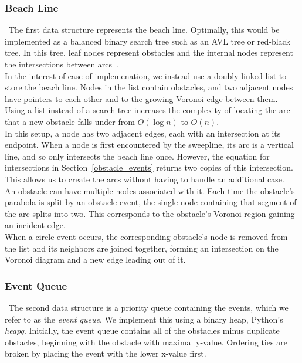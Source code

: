 \documentclass[conference]{IEEEtran}
\begin{document}
\subsubsection{Beach Line}
\noindent\ The first data structure represents the beach line. Optimally,
this would be implemented as a balanced binary search tree such as an AVL tree or
red-black tree. In this tree, leaf nodes represent obstacles and
the internal nodes represent the intersections between arcs~\cite{mitslides}.\\
\indent In the interest of ease of implemenation, we instead use a doubly-linked list to
store the beach line. Nodes in the list contain obstacles, and two adjacent nodes have
pointers to each other and to the growing Voronoi edge between them. Using a list
instead of a search tree increases the complexity of locating the arc that a
new obstacle falls under from $O(\log n)$ to $O(n)$.\\
\indent In this setup, a node has two adjacent edges, each with an intersection
at its endpoint. When a node is first encountered by the sweepline, its arc is a
vertical line, and so only intersects the beach line once. However, the equation
for intersections in Section~\ref{obstacle_events} returns two copies of this
intersection. This allows us to create the arcs without having to handle an
additional case.\\
\indent An obstacle can have multiple nodes associated with it. Each time the
obstacle's parabola is split by an obstacle event, the single node containing
that segment of the arc splits into two. This corresponds to the obstacle's
Voronoi region gaining an incident edge.\\
\indent When a circle event occurs, the corresponding obstacle's node is removed
from the list and its neighbors are joined together, forming an intersection on the
Voronoi diagram and a new edge leading out of it.

\subsubsection{Event Queue}
\noindent\ The second data structure is a priority queue containing the events, which we refer to as
the \emph{event queue}. We implement this using a binary heap, Python's \emph{heapq}.
Initially, the event queue contains all of the obstacles minus duplicate obstacles,
beginning with the obstacle with maximal y-value. Ordering ties are broken by
placing the event with the lower x-value first.
\end{document}
